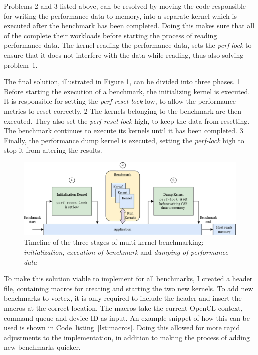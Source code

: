 Problems 2 and 3 listed above, can be resolved by moving the code responsible for writing the performance data to memory, into a separate kernel which is executed after the benchmark has been completed. Doing this makes sure that all of the  complete their workloads before starting the process of reading performance data. The kernel reading the performance data, sets the \textit{perf-lock} to ensure that it does not interfere with the data while reading, thus also solving problem~1. 

The final solution, illustrated in Figure \ref{fig:init_run_dump}, can be divided into three phases. \textcircled{\small{1}} Before starting the execution of a benchmark, the initializing kernel is executed. It is responsible for setting the \textit{perf-reset-lock} low, to allow the performance metrics to reset correctly. \textcircled{\small{2}} The kernels belonging to the benchmark are then executed. They also set the \textit{perf-reset-lock} high, to keep the data from resetting. The benchmark continues to execute its kernels until it has been completed. \textcircled{\small{3}} Finally, the performance dump kernel is executed, setting the \textit{perf-lock} high to stop it from altering the results.

\begin{figure}
    \centering
    \includegraphics[width=\textwidth]{figures/perf-kernels.png}
    \caption[Timeline of the three stages of multi-kernel benchmarking.]{Timeline of the three stages of multi-kernel benchmarking: \textit{initialization}, \textit{execution of benchmark} and \textit{dumping of performance data}}
    \label{fig:init_run_dump}
\end{figure}

To make this solution viable to implement for all benchmarks, I created a header file, containing macros for creating and starting the two new kernels. To add new benchmarks to \Gls{vortex}, it is only required to include the header and insert the macros at the correct location. The macros take the current OpenCL context, command queue and device ID as input. An example snippet of how this can be used is shown in Code~listing~\ref{lst:macros}. Doing this allowed for more rapid adjustments to the implementation, in addition to making the process of adding new benchmarks quicker.

